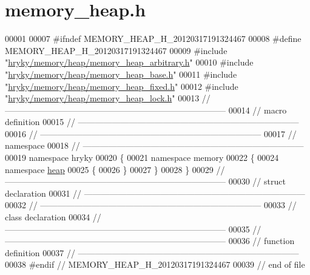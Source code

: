 \hypertarget{memory__heap_8h_source}{\section{memory\-\_\-heap.\-h}
}

\begin{DoxyCode}
00001 
00007 \textcolor{preprocessor}{#ifndef MEMORY\_HEAP\_H\_20120317191324467}
00008 \textcolor{preprocessor}{}\textcolor{preprocessor}{#define MEMORY\_HEAP\_H\_20120317191324467}
00009 \textcolor{preprocessor}{}\textcolor{preprocessor}{#include "\hyperlink{memory__heap__arbitrary_8h}{hryky/memory/heap/memory_heap_arbitrary.h}"}
00010 \textcolor{preprocessor}{#include "\hyperlink{memory__heap__base_8h}{hryky/memory/heap/memory_heap_base.h}"}
00011 \textcolor{preprocessor}{#include "\hyperlink{memory__heap__fixed_8h}{hryky/memory/heap/memory_heap_fixed.h}"}
00012 \textcolor{preprocessor}{#include "\hyperlink{memory__heap__lock_8h}{hryky/memory/heap/memory_heap_lock.h}"}
00013 \textcolor{comment}{//
      ------------------------------------------------------------------------------}
00014 \textcolor{comment}{// macro definition}
00015 \textcolor{comment}{//
      ------------------------------------------------------------------------------}
00016 \textcolor{comment}{//
      ------------------------------------------------------------------------------}
00017 \textcolor{comment}{// namespace}
00018 \textcolor{comment}{//
      ------------------------------------------------------------------------------}
00019 \textcolor{keyword}{namespace }hryky
00020 \{
00021 \textcolor{keyword}{namespace }memory
00022 \{
00024 \textcolor{keyword}{namespace }\hyperlink{namespacehryky_1_1memory_1_1global_a6fc6103f67c837aa0f39b359588409cd}{heap}
00025 \{
00026 \}
00027 \}
00028 \}
00029 \textcolor{comment}{//
      ------------------------------------------------------------------------------}
00030 \textcolor{comment}{// struct declaration}
00031 \textcolor{comment}{//
      ------------------------------------------------------------------------------}
00032 \textcolor{comment}{//
      ------------------------------------------------------------------------------}
00033 \textcolor{comment}{// class declaration}
00034 \textcolor{comment}{//
      ------------------------------------------------------------------------------}
00035 \textcolor{comment}{//
      ------------------------------------------------------------------------------}
00036 \textcolor{comment}{// function definition}
00037 \textcolor{comment}{//
      ------------------------------------------------------------------------------}
00038 \textcolor{preprocessor}{#endif // MEMORY\_HEAP\_H\_20120317191324467}
00039 \textcolor{preprocessor}{}\textcolor{comment}{// end of file}
\end{DoxyCode}
